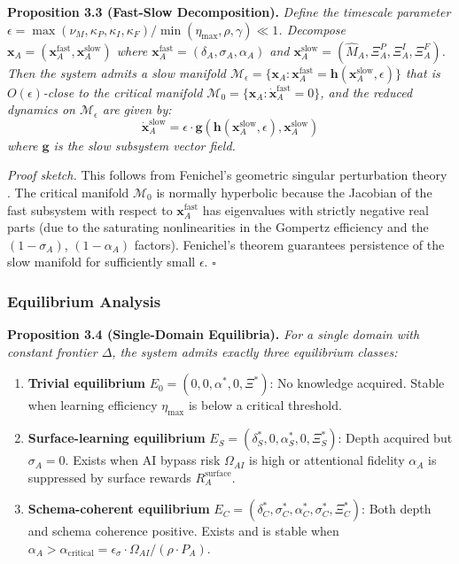 \documentclass[11pt,a4paper]{article}
\begin{document}
\textbf{Proposition 3.3 (Fast-Slow Decomposition).}
\textit{Define the timescale parameter
$\epsilon = \max(\nu_M, \kappa_P, \kappa_I, \kappa_F) / \min(\eta_{\max}, \rho, \gamma) \ll 1$.
Decompose $\mathbf{x}_A = (\mathbf{x}_A^{\text{fast}}, \mathbf{x}_A^{\text{slow}})$ where
$\mathbf{x}_A^{\text{fast}} = (\delta_A, \sigma_A, \alpha_A)$ and
$\mathbf{x}_A^{\text{slow}} = (\hat{M}_A, \Xi_A^P, \Xi_A^I, \Xi_A^F)$.
Then the system admits a slow manifold
$\mathcal{M}_\epsilon = \{ \mathbf{x}_A : \mathbf{x}_A^{\text{fast}} = \mathbf{h}(\mathbf{x}_A^{\text{slow}}, \epsilon) \}$
that is $O(\epsilon)$-close to the critical manifold
$\mathcal{M}_0 = \{ \mathbf{x}_A : \dot{\mathbf{x}}_A^{\text{fast}} = 0 \}$,
and the reduced dynamics on $\mathcal{M}_\epsilon$ are given by:
\begin{equation}\label{eq:reduced-dynamics}
\dot{\mathbf{x}}_A^{\text{slow}} = \epsilon \cdot \mathbf{g}(\mathbf{h}(\mathbf{x}_A^{\text{slow}}, \epsilon), \mathbf{x}_A^{\text{slow}})
\end{equation}
where $\mathbf{g}$ is the slow subsystem vector field.}

\textit{Proof sketch.} This follows from Fenichel's geometric singular
perturbation theory \citep{fenichel1979geometric}. The critical manifold
$\mathcal{M}_0$ is normally hyperbolic because the Jacobian of the fast
subsystem with respect to $\mathbf{x}_A^{\text{fast}}$ has eigenvalues
with strictly negative real parts (due to the saturating nonlinearities
in the Gompertz efficiency and the $(1-\sigma_A)$, $(1-\alpha_A)$ factors).
Fenichel's theorem guarantees persistence of the slow manifold for
sufficiently small $\epsilon$. $\square$

\subsubsection{Equilibrium Analysis}\label{sec:equilibrium}

\textbf{Proposition 3.4 (Single-Domain Equilibria).}
\textit{For a single domain with constant frontier $\Delta$, the system
admits exactly three equilibrium classes:}
\begin{enumerate}[nosep]
\item \textbf{Trivial equilibrium} $E_0 = (0, 0, \alpha^*, 0, \Xi^*)$: No knowledge acquired. Stable when learning efficiency $\eta_{\max}$ is below a critical threshold.
\item \textbf{Surface-learning equilibrium} $E_S = (\delta_S^*, 0, \alpha_S^*, 0, \Xi_S^*)$: Depth acquired but $\sigma_A = 0$. Exists when AI bypass risk $\Omega_{AI}$ is high or attentional fidelity $\alpha_A$ is suppressed by surface rewards $R_A^{\text{surface}}$.
\item \textbf{Schema-coherent equilibrium} $E_C = (\delta_C^*, \sigma_C^*, \alpha_C^*, \sigma_C^*, \Xi_C^*)$: Both depth and schema coherence positive. Exists and is stable when $\alpha_A > \alpha_{\text{critical}} = \epsilon_\sigma \cdot \Omega_{AI} / (\rho \cdot P_A)$.
\end{enumerate}
\end{document}
